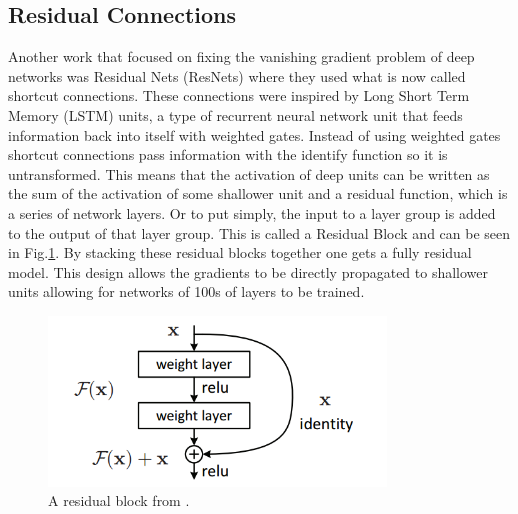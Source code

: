 \subsection{Residual Connections}
Another work that focused on fixing the vanishing gradient problem of deep networks was Residual Nets (ResNets) \cite{he2015deep} where they used what is now called shortcut connections. 
These connections were inspired by Long Short Term Memory (LSTM) units, a type of recurrent neural network unit that feeds information back into itself with weighted gates. 
Instead of using weighted gates shortcut connections pass information with the identify function so it is untransformed. 
This means that the activation of deep units can be written as the sum of the activation of some shallower unit and a residual function, which is a series of network layers. 
Or to put simply, the input to a layer group is added to the output of that layer group. 
This is called a Residual Block and can be seen in Fig.\ref{f:resblock}. 
By stacking these residual blocks together one gets a fully residual model. 
This design allows the gradients to be directly propagated to shallower units allowing for networks of 100s of layers to be trained. 
\begin{figure}[h!]
	\centering
		\includegraphics[width=0.80\textwidth]{figures/resblock.png}
	\caption{A residual block from \cite{he2015deep}.}
	\label{f:resblock}
\end{figure}


